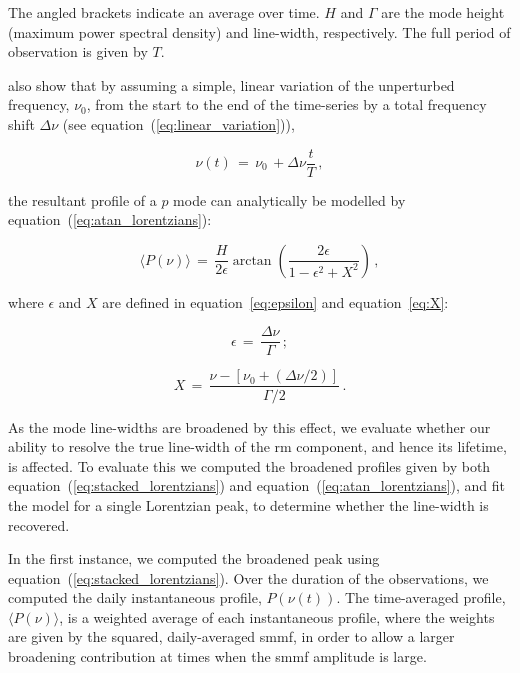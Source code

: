 The angled brackets indicate an average over time. $H$ and $\Gamma$ are the mode height (maximum power spectral density) and line-width, respectively. The full period of observation is given by $T$.

\citet{chaplin_distortion_2008} also show that by assuming a simple, linear variation of the unperturbed frequency, $\nu_0$, from the start to the end of the time-series by a total frequency shift $\Delta\nu$ (see equation~(\ref{eq:linear_variation})),

\begin{equation}
\nu(t) \, = \, \nu_0 \, +  \Delta\nu \frac{t}{T} \, ,
\label{eq:linear_variation}
\end{equation}

the resultant profile of a $p$ mode can analytically be modelled by equation~(\ref{eq:atan_lorentzians}):

\begin{equation}
\langle P(\nu) \rangle \, = \, \frac{H}{2\epsilon} \arctan \left( \frac{2 \epsilon}{1 - \epsilon^2 + X^2 } \right) \, ,
\label{eq:atan_lorentzians}
\end{equation}

where $\epsilon$ and $X$ are defined in equation~\ref{eq:epsilon} and equation~\ref{eq:X}:

\begin{equation}
\epsilon \, = \, \frac{\Delta\nu}{\Gamma} \, ;
\label{eq:epsilon}
\end{equation}

\begin{equation}
X \, = \, \frac{\nu - [\nu_0 + (\Delta\nu/2)]}{\Gamma /2} \, .
\label{eq:X}
\end{equation}

As the mode line-widths are broadened by this effect, we evaluate whether our ability to resolve the true line-width of the \gls{rm} component, and hence its lifetime, is affected. To evaluate this we computed the broadened profiles given by both equation~(\ref{eq:stacked_lorentzians}) and equation~(\ref{eq:atan_lorentzians}), and fit the model for a single Lorentzian peak, to determine whether the line-width is recovered.

In the first instance, we computed the broadened peak using equation~(\ref{eq:stacked_lorentzians}). Over the duration of the observations, we computed the daily instantaneous profile, $P(\nu(t))$. The time-averaged profile, $ \langle P(\nu) \rangle$, is a weighted average of each instantaneous profile, where the weights are given by the squared, daily-averaged \gls{smmf}, in order to allow a larger broadening contribution at times when the \gls{smmf} amplitude is large.

